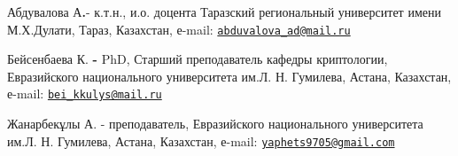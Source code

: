 \begin{authorinfo}
Абдувалова А{\bfseries .}- к.т.н., и.о. доцента Таразский региональный
университет имени М.Х.Дулати, Тараз, Казахстан, е-mail:
\href{mailto:abduvalova_ad@mail.ru}{\nolinkurl{abduvalova\_ad@mail.ru}}

Бейсенбаева К. {\bfseries -} PhD, Старший преподаватель кафедры
криптологии, Евразийского национального университета им.Л. Н. Гумилева,
Астана, Казахстан, е-mail:
\href{mailto:bei_kkulys@mail.ru}{\nolinkurl{bei\_kkulys@mail.ru}}

Жанарбекұлы А. - преподаватель, Евразийского национального университета
им.Л. Н. Гумилева, Астана, Казахстан, е-mail:
\href{mailto:yaphets9705@gmail.com}{\nolinkurl{yaphets9705@gmail.com}}
\end{authorinfo}

